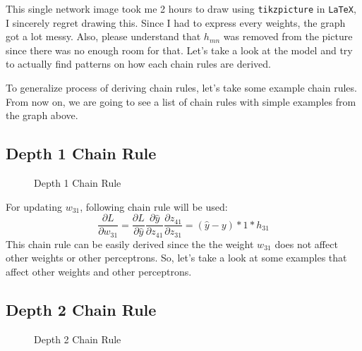 \documentclass{homework}
\begin{document}
This single network image took me 2 hours to draw using \texttt{tikzpicture} in \texttt{LaTeX}, I sincerely regret drawing this. Since I had to express every weights, the graph got a lot messy. Also, please understand that $h_{mn}$ was removed from the picture since there was no enough room for that. Let's take a look at the model and try to actually find patterns on how each chain rules are derived.

To generalize process of deriving chain rules, let's take some example chain rules. From now on, we are going to see a list of chain rules with simple examples from the graph above.
\subsection{Depth 1 Chain Rule}
\begin{figure}[h]
    \centering
    \caption{Depth 1 Chain Rule}
    \label{fig:my_label}
\end{figure}

For updating $w_{31}$, following chain rule will be used:
\[
    \frac{\partial L}{\partial w_{31}} = \frac{\partial L}{\partial \hat{y}} \frac{\partial \hat{y}}{\partial z_{41}}\frac{\partial z_{41}}{\partial z_{31}} = (\hat{y} - y)*1*h_{31} 
\]
This chain rule can be easily derived since the the weight $w_{31}$ does not affect other weights or other perceptrons. So, let's take a look at some examples that affect other weights and other perceptrons.

\pagebreak
\subsection{Depth 2 Chain Rule}
\begin{figure}[h]
    \centering
    \caption{Depth 2 Chain Rule}
    \label{fig:my_label}
\end{figure}
\end{document}
